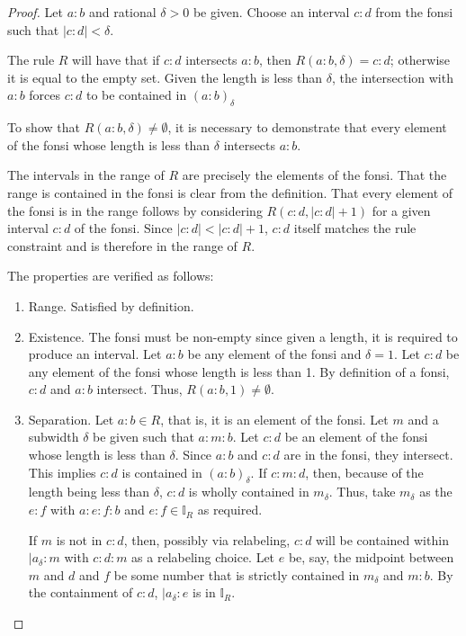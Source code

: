 \documentclass[12pt]{article}
\begin{document}
\begin{proof}
    Let $a:b$ and rational $\delta>0$ be given. Choose an interval $c:d$ from the fonsi such that $|c:d| < \delta$. 

    The rule $R$ will have that if $c:d$ intersects $a:b$, then $R(a:b, \delta) = c:d$; otherwise it is equal to the empty set. Given the length is less than $\delta$, the intersection with $a:b$ forces $c:d$ to be contained in $(a:b)_{\delta}$



    To show that $R(a:b, \delta) \neq \emptyset$, it is necessary to demonstrate that every element of the fonsi whose length is less than $\delta$ intersects $a:b$. 
    
    The intervals in the range of $R$ are precisely the elements of the fonsi. That the range is contained in the fonsi is clear from the definition. That every element of the fonsi is in the range follows by considering $R(c:d, |c:d|+1)$ for a given interval $c:d$ of the fonsi. Since $|c:d| < |c:d|+1$, $c:d$ itself matches the rule constraint and is therefore in the range of $R$. 

    The properties are verified as follows: 
    \begin{enumerate}
        \item Range. Satisfied by definition. 
        \item Existence. The fonsi must be non-empty since given a length, it is required to produce an interval. Let $a:b$ be any element of the fonsi and $\delta =1$. Let $c:d$ be any element of the fonsi whose length is less than 1. By definition of a fonsi, $c:d$ and $a:b$ intersect. Thus, $R(a:b, 1) 
        \neq \emptyset$.
        \item Separation. 
        Let $a:b \in R$, that is, it is an element of the fonsi. Let $m$ and a subwidth $\delta$ be given such that $a:m:b$. Let $c:d$ be an element of the fonsi whose length is less than $\delta$. Since $a:b$ and $c:d$ are in the fonsi, they intersect. This implies $c:d$ is contained in $(a:b)_\delta$. If $c:m:d$, then, because of the length being less than $\delta$, $c:d$ is wholly contained in $m_\delta$. Thus, take $m_\delta$ as the $e:f$ with $a:e:f:b$ and $e:f \in \mathbb{I}_{R}$ as required. 
        
        If $m$ is not in $c:d$, then, possibly via relabeling, $c:d$ will be contained within $|a_\delta:m$ with $c:d:m$ as a relabeling choice. Let $e$ be, say, the midpoint between $m$ and $d$ and $f$ be some number that is strictly contained in $m_\delta$ and $m:b$. By the containment of $c:d$, $|a_\delta:e$ is in $\mathbb{I}_R$.
        

\end{enumerate}
\end{proof}
\end{document}
